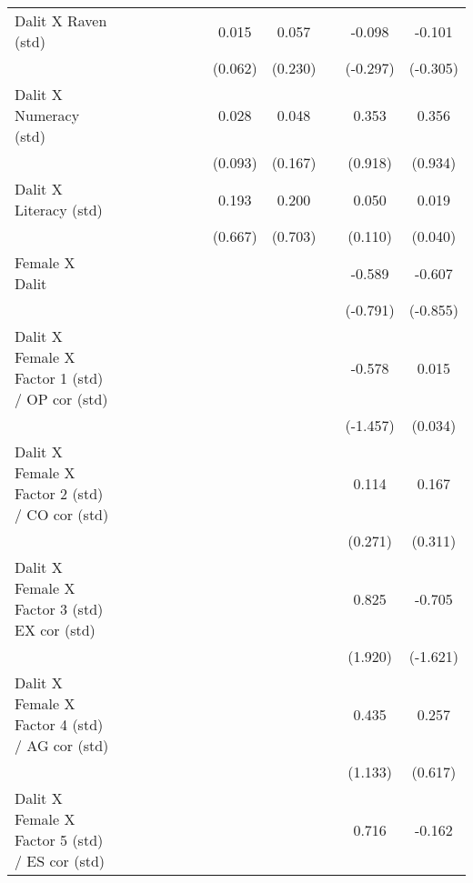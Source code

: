 {\begin{longtable}{@{\extracolsep{\fill}}lccccccccccc}
    Dalit X Raven (std) &       &       &       &       &       &       & 0.015 & 0.057 &       & -0.098 & -0.101 \\
          &       &       &       &       &       &       & (0.062) & (0.230) &       & (-0.297) & (-0.305) \\
    Dalit X Numeracy (std) &       &       &       &       &       &       & 0.028 & 0.048 &       & 0.353 & 0.356 \\
          &       &       &       &       &       &       & (0.093) & (0.167) &       & (0.918) & (0.934) \\
    Dalit X Literacy (std) &       &       &       &       &       &       & 0.193 & 0.200 &       & 0.050 & 0.019 \\
          &       &       &       &       &       &       & (0.667) & (0.703) &       & (0.110) & (0.040) \\
    Female X Dalit &       &       &       &       &       &       &       &       &       & -0.589 & -0.607 \\
          &       &       &       &       &       &       &       &       &       & (-0.791) & (-0.855) \\
    Dalit X Female X Factor 1 (std) / OP cor (std) &       &       &       &       &       &       &       &       &       & -0.578 & 0.015 \\
          &       &       &       &       &       &       &       &       &       & (-1.457) & (0.034) \\
    Dalit X Female X Factor 2 (std) / CO cor (std) &       &       &       &       &       &       &       &       &       & 0.114 & 0.167 \\
          &       &       &       &       &       &       &       &       &       & (0.271) & (0.311) \\
    Dalit X Female X Factor 3 (std) EX cor (std) &       &       &       &       &       &       &       &       &       & 0.825 & -0.705 \\
          &       &       &       &       &       &       &       &       &       & (1.920) & (-1.621) \\
    Dalit X Female X Factor 4 (std) / AG cor (std) &       &       &       &       &       &       &       &       &       & 0.435 & 0.257 \\
          &       &       &       &       &       &       &       &       &       & (1.133) & (0.617) \\
    Dalit X Female X Factor 5 (std) / ES cor (std) &       &       &       &       &       &       &       &       &       & 0.716 & -0.162 \\

\end{longtable}}

